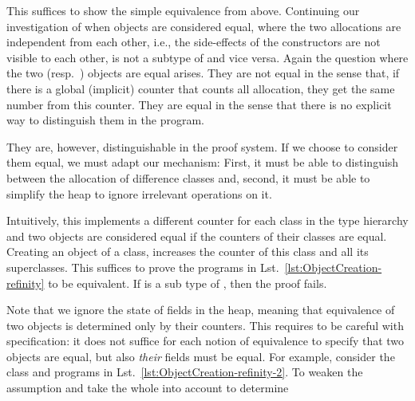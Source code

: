 \begin{definition}
\end{definition}

This suffices to show the simple equivalence from above. Continuing our investigation of when objects are considered equal, 
where the two allocations are independent from each other, i.e., the side-effects of the constructors are not visible to each other,  is not a subtype of  and vice versa. Again the question where the two  (resp.\ ) objects are equal arises. They are not equal in the sense that, if there is a global (implicit) counter
that counts all allocation, they get the same number from this counter. They are equal in the sense that there is no explicit way to distinguish them in the program.

They are, however, distinguishable in the proof system. If we choose to consider them equal, we must adapt our  mechanism:
First, it must be able to distinguish between the allocation of difference classes and, second, it must be able to simplify the heap to ignore irrelevant operations on it.
\begin{definition}
\end{definition}
Intuitively, this implements a different counter for each class in the type hierarchy and two objects are considered equal if the counters of their classes are equal.
Creating an object of a class, increases the counter of this class and all its superclasses.
This suffices to prove the programs in Lst.~\ref{lst:ObjectCreation-refinity} to be equivalent. If  is a sub type of , then the proof fails.

Note that we ignore the state of fields in the heap, meaning that equivalence of two objects is determined only by their counters. 
This requires to be careful with specification: it does not suffice for each notion of equivalence to specify that two objects are equal, but also \emph{their} fields must be equal.
For example, consider the class and programs in Lst.~\ref{lst:ObjectCreation-refinity-2}. To weaken the assumption and take the whole into account to determine  

